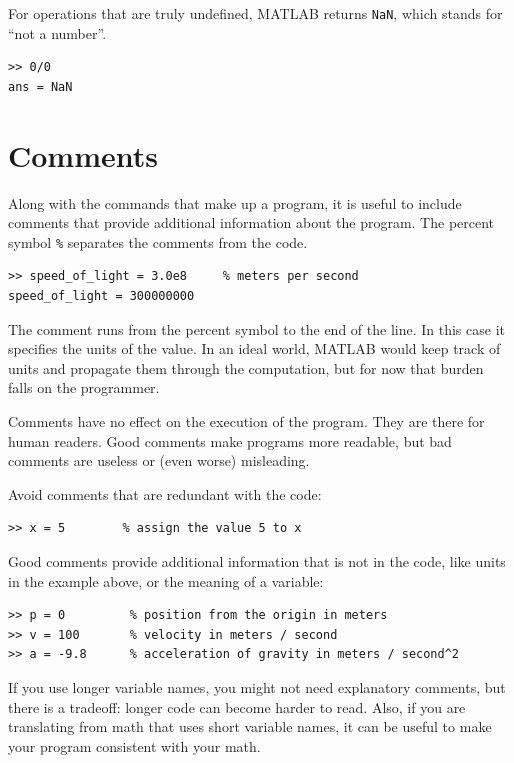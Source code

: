 \documentclass{book}
\begin{document}
For operations that are truly undefined, MATLAB returns {\tt NaN},
which stands for ``not a number''.

\begin{verbatim}
>> 0/0
ans = NaN
\end{verbatim}



\section{Comments}

Along with the commands that make up a program, it is useful
to include comments that provide additional information about the
program.  The percent symbol {\tt \%} separates
the comments from the code.

\begin{verbatim}
>> speed_of_light = 3.0e8     % meters per second
speed_of_light = 300000000
\end{verbatim}

The comment runs from the percent symbol to the end of the line.
In this case it specifies the units of the value.  In an ideal world,
MATLAB would keep track of units and propagate them through the
computation, but for now that burden falls on the programmer.

Comments have no effect on the execution of the program.  They
are there for human readers.  Good comments make programs more
readable, but bad comments are useless or (even worse) misleading.

Avoid comments that are redundant with the code:

\begin{verbatim}
>> x = 5        % assign the value 5 to x
\end{verbatim}

Good comments provide additional information that is not in the
code, like units in the example above, or the meaning of a variable:

\begin{verbatim}
>> p = 0         % position from the origin in meters
>> v = 100       % velocity in meters / second
>> a = -9.8      % acceleration of gravity in meters / second^2
\end{verbatim}

If you use longer variable names, you might not need explanatory
comments, but there is a tradeoff: longer code can become harder
to read.  Also, if you are translating from math
that uses short variable names, it can be useful to make your
program consistent with your math.
\end{document}
